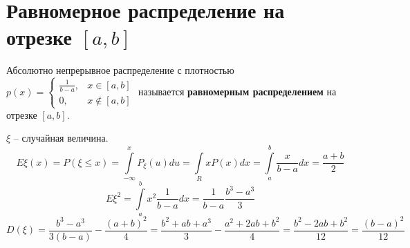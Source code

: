 \section{Равномерное распределение на отрезке $[a,b]$}

\begin{definition}
  Абсолютно непрерывное распределение с плотностью $p(x) = \left\{\begin{matrix}
  \frac{1}{b-a}, & x\in [a, b]\\
  0, & x \notin [a, b]
  \end{matrix}\right.$ называется \textbf{равномерным распределением} на отрезке $[a,b]$.
\end{definition}

$\xi$ -- случайная величина.
$$E\xi(x) = P(\xi\leq x)=\int\limits_{-\infty}^x P_\xi (u) du = \int\limits_R x P(x) dx = \int\limits_a^b \frac{x}{b-a}dx=\frac{a+b}{2}$$
$$E\xi^2 = \int\limits_a^b x^2\frac{1}{b-a}dx=\frac{1}{b-a}\frac{b^3-a^3}{3}$$
$$D(\xi)=\frac{b^3-a^3}{3(b-a)}-\frac{(a+b)^2}{4}=\frac{b^2+ab+a^3}{3}-\frac{a^2+2ab+b^2}{4}=\frac{b^2-2ab+b^2}{12}=\frac{(b-a)^2}{12}$$
